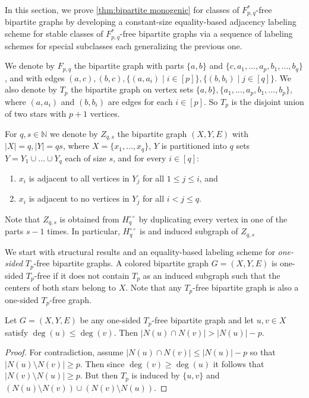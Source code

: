 \documentclass{article}
\newcommand{\bN}{\ensuremath{\mathbb{N}}}
\begin{document}
In this section, we prove \cref{thm:bipartite monogenic} for classes of $F^*_{p,q}$-free bipartite
graphs by developing a constant-size equality-based adjacency labeling scheme for stable classes of
$F^*_{p,q}$-free bipartite graphs via a sequence of labeling schemes for special subclasses each
generalizing the previous one.

We denote by $F_{p,q}$ the bipartite graph with parts $\{a,b\}$ and $\{c, a_1, \dotsc, a_p, b_1,
\dotsc, b_q\}$, and with edges $(a,c), (b,c), \{(a,a_i) \mid i \in [p] \}, \{(b,b_i) \mid j \in
[q]\}$.  We also denote by $T_p$ the bipartite graph on vertex sets $\{a,b\}, \{a_1, \dotsc, a_p,
b_1, \dotsc, b_p\}$, where $(a,a_i)$ and $(b,b_i)$ are edges for each $i \in [p]$. So $T_p$ is the
disjoint union of two stars with $p+1$ vertices.

\begin{definition}
For $q,s \in \bN$ we denote by $Z_{q,s}$ the bipartite graph $(X,Y,E)$ with 
$|X|=q, |Y|=qs$, where $X = \{x_1, \ldots, x_q \}$, $Y$ is partitioned into $q$
sets $Y = Y_1 \cup \ldots \cup Y_q$ each of size $s$, and for every $i \in [q]$:
\begin{enumerate}[label=\textup{(\arabic*)}]
\item $x_i$ is adjacent to all vertices in $Y_j$ for all $1 \leq j \leq i$, and
\item $x_i$ is adjacent to no vertices in $Y_j$ for all $i < j \leq q$.
\end{enumerate}
\end{definition}
\noindent
Note that $Z_{q,s}$ is obtained from $H^{\circ\circ}_q$ by duplicating every vertex in one of the parts $s-1$ times. In particular, $H^{\circ\circ}_q$ is and induced subgraph of $Z_{q,s}$

\medskip
\noindent
We start with structural results and an equality-based labeling scheme for \emph{one-sided} $T_p$-free bipartite graphs.
A colored bipartite graph $G = (X,Y,E)$ is one-sided $T_p$-free if it does not contain $T_p$
as an induced subgraph such that the centers of both stars belong to $X$. Note that
any $T_p$-free bipartite graph is also a one-sided $T_p$-free graph.

\begin{proposition}
\label{prop:degree order}
Let $G = (X,Y,E)$ be any one-sided $T_p$-free bipartite graph and let $u,v \in X$ satisfy $\deg(u) \leq
\deg(v)$. Then $|N(u) \cap N(v)| > |N(u)|-p$.
\end{proposition}
\begin{proof}
For contradiction, assume $|N(u) \cap N(v)| \leq |N(u)|-p$ so that $|N(u) \setminus N(v)| \geq p$.
Then since $\deg(v) \geq \deg(u)$ it follows that $|N(v) \setminus N(u)| \geq p$. But then $T_p$ is
induced by $\{u,v\}$ and $(N(u)\setminus N(v)) \cup (N(v) \setminus N(u))$.
\end{proof}
\end{document}
